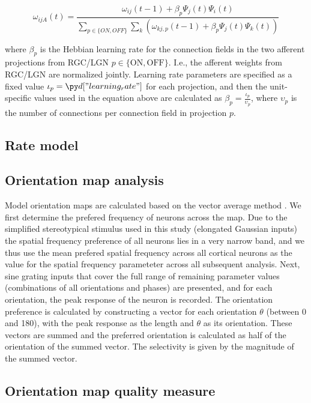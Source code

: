 \documentclass[a4paper,10pt]{article}
\begin{document}
\begin{equation}
\omega_{ijA}(t)=\frac{\omega_{ij}(t-1)+\beta_{p}\Psi_{j}(t)\Psi_{i}(t)}{\sum_{p \in \{ON,OFF\}}\sum_{k}\left(\omega_{kj,p}(t-1)+\beta_{p}\Psi_{j}(t)\Psi_{k}(t)\right)}
\end{equation}

where $\beta_{p}$ is the Hebbian learning rate for the connection fields in the two afferent projections from RGC/LGN $p \in \{\mathrm{ON},\mathrm{OFF}\}$. I.e., the afferent weights from RGC/LGN are normalized jointly.  Learning rate parameters are specified as
a fixed value $\iota_{p}=\insval{learning_rate}$ for each projection, and then the unit-specific values used in the equation above are calculated as
$\beta_{p}=\frac{\iota_{p}}{\upsilon_{p}}$, where $\upsilon_{p}$ is the number of connections per connection field in projection $p$.  

\subsection{Rate model}

\subsection{Orientation map analysis}

Model orientation maps are calculated based on the vector average method \cite{CMVC}. We first determine the prefered frequency of neurons 
across the map. Due to the simplified stereotypical stimulus used in this study (elongated Gaussian inputs) the spatial frequency 
preference of all neurons lies in a very narrow band, and we thus use the mean prefered spatial frequency across all cortical neurons as the
value for the spatial frequency parameteter across all subsequent analysis. Next, sine grating inputs that cover the full range of remaining parameter values (combinations of all orientations and phases) are presented, and for each orientation, the peak response of the neuron is recorded. The orientation preference is calculated by constructing a vector for each orientation $\theta$ (between 0 and 180\circ), with the peak response as
the length and $\theta$ as its orientation. These vectors are summed and the preferred orientation is calculated as half of the orientation of the summed vector. The selectivity is given by the magnitude of the summed vector. 

\subsection{Orientation map quality measure}
\end{document}
